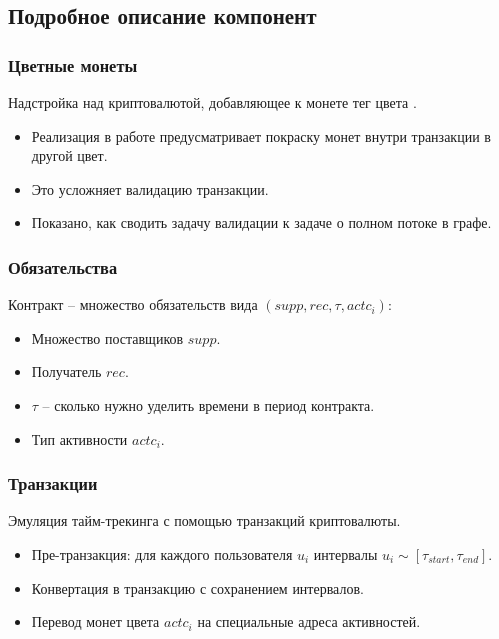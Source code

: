 \documentclass[11pt,handout,pdf,hyperref={unicode}]{beamer}
\begin{document}
\subsection{Подробное описание компонент}

\begin{frame}
  \frametitle{Цветные монеты}

  Надстройка над криптовалютой, добавляющее к монете тег цвета
  \parencite{epobc} \parencite{oap}.

  \begin{itemize}
  \item Реализация в работе предусматривает покраску монет внутри
    транзакции в другой цвет.
  \item Это усложняет валидацию транзакции.
  \item Показано, как сводить задачу валидации к задаче о полном
    потоке в графе.
  \end{itemize}
\end{frame}

\begin{frame}
  \frametitle{Обязательства}

  Контракт -- множество обязательств вида $(supp, rec, \tau,
  actc_i)$:
  \begin{itemize}
  \item Множество поставщиков $supp$.
  \item Получатель $rec$.
  \item $\tau$ -- сколько нужно уделить времени в период контракта.
  \item Тип активности $actc_i$.
  \end{itemize}
\end{frame}

\begin{frame}
  \frametitle{Транзакции}

  Эмуляция тайм-трекинга с помощью транзакций криптовалюты.
  \begin{itemize}
  \item Пре-транзакция: для каждого пользователя $u_i$ интервалы $u_i
    \sim [\tau_{start}, \tau_{end}]$.
  \item Конвертация в транзакцию с сохранением интервалов.
  \item Перевод монет цвета $actc_i$ на специальные адреса
    активностей.
  \end{itemize}
\end{frame}
\end{document}
